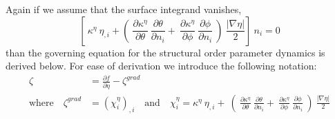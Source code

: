 Again if we assume that the surface integrand vanishes,
\begin{equation}
\left[ ~\kappa^\eta~\eta_{,i}  + \left( ~\frac{\partial \kappa^\eta}{\partial \theta} ~\frac{\partial \theta}{\partial n_i} +  ~\frac{\partial \kappa^\eta}{\partial \phi} ~\frac{\partial \phi}{\partial n_i} ~\right) ~\frac{|\nabla \eta|}{2}  \right] ~n_{i} = 0
\label{eqACSurfaceCondition}
\end{equation}
than the governing equation for the structural order parameter dynamics is derived below. For ease of derivation we introduce the following notation:
\begin{align}
\zeta &= \frac{\partial f}{\partial \eta} - \zeta^{grad}\\
\text{where} \quad \zeta^{grad} &= (\chi^\eta_i)_{,i} \quad \text{and} \quad \chi^\eta_i = \kappa^\eta~\eta_{,i} + ~\left(~\frac{\partial \kappa^\eta}{\partial \theta} ~\frac{\partial \theta}{\partial n_i} +  ~\frac{\partial \kappa^\eta}{\partial \phi} ~\frac{\partial \phi}{\partial n_i} ~\right) ~\frac{|\nabla \eta|}{2} \nonumber
\end{align}

